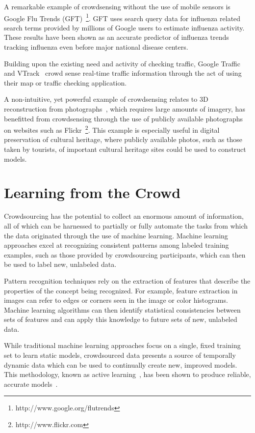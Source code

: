 \documentclass[10pt,twocolumn]{article}
\begin{document}
A remarkable example of crowdsensing without the use of mobile sensors is
Google Flu Trends (GFT)~\footnote{http://www.google.org/flutrends}. 
GFT uses search query data for influenza related search terms provided 
by millions of Google users to estimate influenza activity. These 
results have been shown as an accurate predictor of influenza 
trends~\cite{Dugas2012} tracking influenza even before 
major national disease centers.

Building upon the existing need and activity of checking
traffic, Google Traffic~\cite{GoogleTraffic} and VTrack~\cite{Thiagarajan2009}
crowd sense real-time traffic information through the act of
using their map or traffic checking application.

A non-intuitive, yet powerful example of crowdsensing relates
to 3D reconstruction from photographs~\cite{Agarwal2009,Frahm2010},
which requires large amounts of imagery, has benefitted from
crowdsensing through the use of publicly available photographs
on websites such as Flickr~\footnote{http://www.flickr.com}. This 
example is especially useful in digital preservation of cultural
heritage, where publicly available photos, such as those taken 
by tourists, of important cultural heritage sites could be used 
to construct models.


\section{Learning from the Crowd}
\label{sec:learning}
Crowdsourcing has the potential to collect an enormous amount of
information, all of which can be harnessed to partially or fully 
automate the tasks from which the data originated through the use of 
machine learning. Machine learning approaches excel at recognizing
consistent patterns among labeled training examples, such as those
provided by crowdsourcing participants, which can then be used to 
label new, unlabeled data.

Pattern recognition techniques rely on the extraction of features
that describe the properties of the concept being recognized. For
example, feature extraction in images can refer to edges or corners 
seen in the image or color histograms. Machine learning algorithms
can then identify statistical consistencies between sets of
features and can apply this knowledge to future sets of new,
unlabeled data.

While traditional machine learning approaches focus on a single,
fixed training set to learn static models, crowdsourced data presents
a source of temporally dynamic data which can be used to continually
create new, improved models. This methodology, known as active 
learning~\cite{Druck2009,Settles2010}, has been shown to produce reliable,
accurate models~\cite{Barrington2012,Brew2010}.
\end{document}
